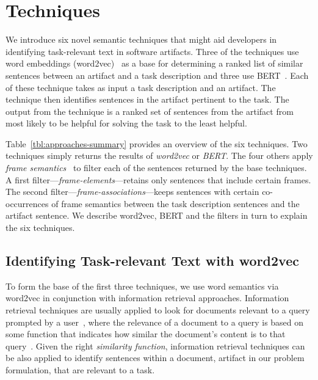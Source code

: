 
\section{Techniques}
\label{cp5:approaches}



We introduce six novel semantic techniques that might 
aid developers in identifying
task-relevant text in software artifacts. Three of the
techniques use word embeddings (word2vec)~\cite{Mikolov2013} as a base for determining a ranked list of similar sentences between an artifact
and a task description and three use BERT~\cite{Devlin2018Bert}.
Each of these technique takes as input
a task description and an artifact. The technique then identifies
sentences in the artifact pertinent to the task. The output
from the technique is a ranked set of sentences from
the artifact from most likely to be helpful for solving the
task to the least helpful.



Table~\ref{tbl:approaches-summary} provides an overview of the six techniques.
Two techniques simply returns the results of \textit{word2vec} or \textit{BERT}.
The four others apply \textit{frame semantics}~\cite{fillmore1976frame} to filter
 each of the sentences returned by the base techniques.
A first filter---\textit{frame-elements}---retains only sentences
that include certain frames. The second filter---\textit{frame-associations}---keeps
sentences with certain co-occurrences of 
frame semantics between the task description sentences
and the artifact sentence. We describe word2vec, BERT and the filters in turn to
explain the six techniques.






\subsection{Identifying Task-relevant Text with word2vec}
\label{cp5:approach-w2v}



To form the base of the first three techniques,  we use word semantics via word2vec in conjunction with information retrieval approaches.
Information retrieval techniques are usually applied to look for documents relevant to a query prompted by a user~\cite{Bavota2016}, where the relevance of a document to a query is based on some function that indicates how similar the document's content is to that query~\cite{Manning2009IR}. Given the right \textit{similarity function}, information retrieval  techniques 
can be also applied to identify sentences within a document, artifact in our problem formulation, that are relevant to a task.



